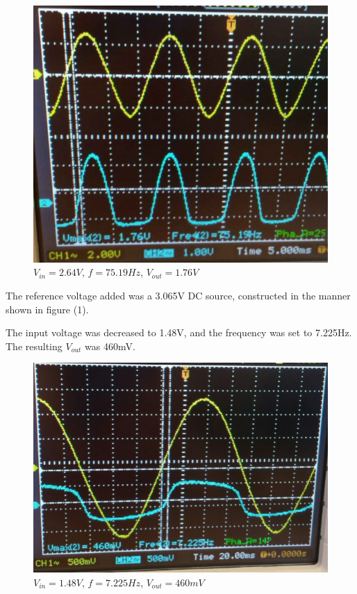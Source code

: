 \documentclass[twocolumn, amsmath]{revtex4}
\begin{document}
\begin{figure}[h]
    \includegraphics[scale=0.45]{1760mV.png}  
    \caption{$V_{in} = 2.64V$, $f=75.19Hz$, $V_{out}= 1.76V$}
\end{figure}


The reference voltage added was a 3.065V DC source, constructed in the manner shown in figure (1). 

The input voltage was decreased to 1.48V, and the frequency was set to 7.225Hz. The resulting $V_{out}$ was 460mV.

\begin{figure}[h]
    \includegraphics[scale=0.45]{460mV.png}  
    \caption{$V_{in}= 1.48V$, $f=7.225Hz$, $V_{out}= 460mV$}
\end{figure}
\end{document}

